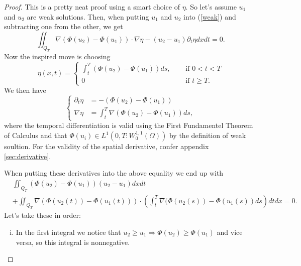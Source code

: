 \documentclass[11pt, a4paper]{article}
\begin{document}
\begin{proof}
This is a pretty neat proof using a smart choice of $\eta$. So let's assume $u_1$ and $u_2$ are weak solutions. Then, when putting $u_1$ and $u_2$ into (\ref{weak}) and subtracting one from the other, we get
\begin{equation}
\label{weak_diff}
\iint_{Q_T}\nabla(\Phi(u_2) - \Phi(u_1)) \cdot \nabla \eta - (u_2 - u_1)\partial_t \eta dxdt = 0.
\end{equation}
Now the inspired move is choosing
\begin{equation*}
\eta(x,t) = \begin{cases}
		\int_t^T(\Phi(u_2) - \Phi(u_1))ds, \quad &\text{ if } 0 < t < T \\
		0 \quad &\text{ if } t\geq T.
	\end{cases}
\end{equation*}
We then have
\begin{equation*}
\begin{cases}
	\partial_t \eta &= -(\Phi(u_2) - \Phi(u_1) ) \\
	\nabla \eta &= \int_t^T\nabla (\Phi(u_2) - \Phi(u_1))ds,
\end{cases}
\end{equation*}
where the temporal differentiation is valid using the First Fundamentel Theorem of Calculus and that $\Phi(u_i) \in L^1(0,T : W_0^{1,1}(\Omega))$ by the definition of weak soultion. For the validity of the spatial derivative, confer appendix \ref{sec:derivative}.

When putting these derivatives into the above equality we end up with
\begin{equation}
\label{unique}
\begin{aligned}
	&\iint_{Q_T}(\Phi(u_2) - \Phi(u_1))(u_2 - u_1)dxdt \\ 
	&+ \iint_{Q_T}\nabla(\Phi(u_2(t)) - \Phi(u_1(t))) \cdot \left(\int_t^T 					\nabla(\Phi(u_2(s)) - \Phi(u_1(s))ds\right)dtdx = 0.
\end{aligned}
\end{equation}
Let's take these in order:
\begin{enumerate}[i)]
	\item In the first integral we notice that $u_2 \geq u_1 \Rightarrow \Phi(u_2) \geq \Phi(u_1)$ and vice versa, so this integral is nonnegative.
	

\end{enumerate}
\end{proof}
\end{document}
